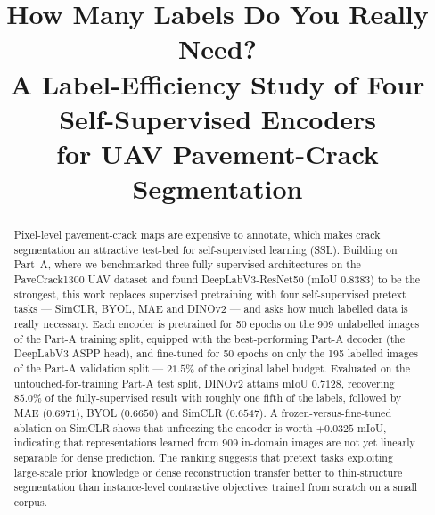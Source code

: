 \documentclass[conference]{IEEEtran}
\begin{document}
\title{How Many Labels Do You Really Need?\\
A Label-Efficiency Study of Four Self-Supervised Encoders\\
for UAV Pavement-Crack Segmentation}

\author{
}

\maketitle

\begin{abstract}
Pixel-level pavement-crack maps are expensive to annotate, which makes crack
segmentation an attractive test-bed for self-supervised learning (SSL). Building on
Part~A, where we benchmarked three fully-supervised architectures on the
PaveCrack1300 UAV dataset and found DeepLabV3-ResNet50 (mIoU $0.8383$) to be the
strongest, this work replaces supervised pretraining with four self-supervised
pretext tasks --- SimCLR, BYOL, MAE and DINOv2 --- and asks how much labelled data is
really necessary. Each encoder is pretrained for 50 epochs on the 909 unlabelled
images of the Part-A training split, equipped with the best-performing Part-A
decoder (the DeepLabV3 ASPP head), and fine-tuned for 50 epochs on only the 195
labelled images of the Part-A validation split --- $21.5\%$ of the original label
budget. Evaluated on the untouched-for-training Part-A test split, DINOv2 attains
mIoU $0.7128$, recovering $85.0\%$ of the fully-supervised result with roughly one
fifth of the labels, followed by MAE ($0.6971$), BYOL ($0.6650$) and SimCLR
($0.6547$). A frozen-versus-fine-tuned ablation on SimCLR shows that unfreezing the
encoder is worth $+0.0325$ mIoU, indicating that representations learned from 909
in-domain images are not yet linearly separable for dense prediction. The ranking
suggests that pretext tasks exploiting large-scale prior knowledge or dense
reconstruction transfer better to thin-structure segmentation than instance-level
contrastive objectives trained from scratch on a small corpus.
\end{abstract}
\end{document}
